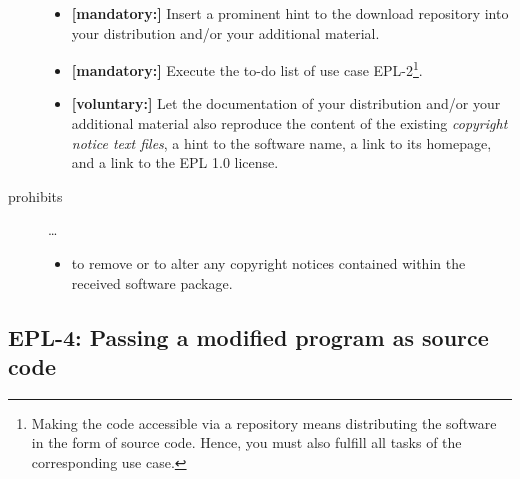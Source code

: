 \begin{description}
\begin{itemize}
  \item \textbf{[mandatory:]} Insert a prominent hint to the download repository
  into your distribution and/or your additional material.
  
  \item \textbf{[mandatory:]} Execute the to-do list of use case EPL-2\footnote{
  Making the code accessible via a repository means distributing the software in
  the form of source code. Hence, you must also fulfill all tasks of the
  corresponding use case.}.
  
  \item \textbf{[voluntary:]} Let the documentation of your distribution and/or
  your additional material also reproduce the content of the existing
  \emph{copyright notice text files}, a hint to the software name, a link to its
  homepage, and a link to the EPL 1.0 license.
    
\end{itemize}

\item[prohibits] \ldots
\begin{itemize}
  \item to remove or to alter any copyright notices contained within the
  received software package.
\end{itemize}

\end{description}

\subsection{EPL-4: Passing a modified program as source code}
\label{OSUC-04S-EPL} 

